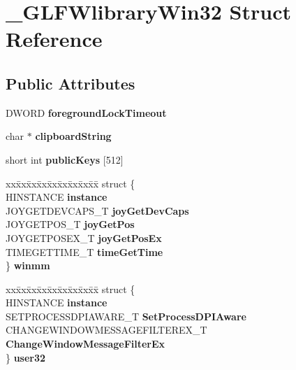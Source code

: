 \hypertarget{struct__GLFWlibraryWin32}{}\section{\+\_\+\+G\+L\+F\+Wlibrary\+Win32 Struct Reference}
\label{struct__GLFWlibraryWin32}
\subsection*{Public Attributes}
\begin{DoxyCompactItemize}
\item 
\hypertarget{struct__GLFWlibraryWin32_a348783bede840a99987a498af6c6cee7}{}D\+W\+O\+R\+D {\bfseries foreground\+Lock\+Timeout}\label{struct__GLFWlibraryWin32_a348783bede840a99987a498af6c6cee7}

\item 
\hypertarget{struct__GLFWlibraryWin32_adf964a0fdd5190f55acfb420ced56ad1}{}char $\ast$ {\bfseries clipboard\+String}\label{struct__GLFWlibraryWin32_adf964a0fdd5190f55acfb420ced56ad1}

\item 
\hypertarget{struct__GLFWlibraryWin32_a3db65fa08d72424dd98d527f6c83baa3}{}short int {\bfseries public\+Keys} \mbox{[}512\mbox{]}\label{struct__GLFWlibraryWin32_a3db65fa08d72424dd98d527f6c83baa3}

\item 
\hypertarget{struct__GLFWlibraryWin32_a2b181252ef6264bf2881bd0a3bbc09ec}{}\begin{tabbing}
xx\=xx\=xx\=xx\=xx\=xx\=xx\=xx\=xx\=\kill
struct \{\\
\>HINSTANCE {\bfseries instance}\\
\>JOYGETDEVCAPS\_T {\bfseries joyGetDevCaps}\\
\>JOYGETPOS\_T {\bfseries joyGetPos}\\
\>JOYGETPOSEX\_T {\bfseries joyGetPosEx}\\
\>TIMEGETTIME\_T {\bfseries timeGetTime}\\
\} {\bfseries winmm}\label{struct__GLFWlibraryWin32_a2b181252ef6264bf2881bd0a3bbc09ec}
\\

\end{tabbing}\item 
\hypertarget{struct__GLFWlibraryWin32_a226127e7a16466d01d045a807f255af6}{}\begin{tabbing}
xx\=xx\=xx\=xx\=xx\=xx\=xx\=xx\=xx\=\kill
struct \{\\
\>HINSTANCE {\bfseries instance}\\
\>SETPROCESSDPIAWARE\_T {\bfseries SetProcessDPIAware}\\
\>CHANGEWINDOWMESSAGEFILTEREX\_T {\bfseries ChangeWindowMessageFilterEx}\\
\} {\bfseries user32}\label{struct__GLFWlibraryWin32_a226127e7a16466d01d045a807f255af6}
\\


\end{tabbing}
\end{DoxyCompactItemize}
